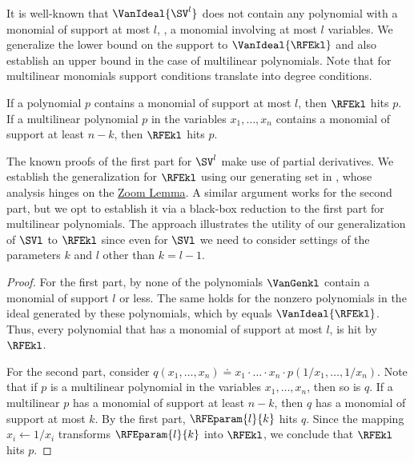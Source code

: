 \documentclass{toc}
\begin{document}
It is well-known that $\VanIdeal{\SV^l}$ does not contain any polynomial with a monomial of support at most $l$, \ie, a monomial involving at most $l$ variables. We generalize the lower bound on the support to $\VanIdeal{\RFEkl}$ and also establish an upper bound in the case of multilinear polynomials. Note that for multilinear monomials support conditions translate into degree conditions.
\begin{proposition}
    \label{prop.ideal.membership.degree-bound}
    If a polynomial $p$ contains a monomial of support at most $l$, then $\RFEkl$ hits $p$. 
    If a multilinear polynomial $p$ in the variables $x_1,\dots,x_n$ contains a monomial of support at least $n-k$, then $\RFEkl$ hits $p$.
\end{proposition}
The known proofs of the first part for $\SV^l$ make use of partial derivatives. We establish the generalization for $\RFEkl$ using our generating set in , whose analysis hinges on the \hyperref[lem.multi-zsub-deriv]{Zoom Lemma}. A similar argument works for the second part, but we opt to establish it via a black-box reduction to the first part for multilinear polynomials. The approach illustrates the utility of our generalization of $\SVl$ to $\RFEkl$ since even for $\SVl$ we need to consider settings of the parameters $k$ and $l$ other than $k=l-1$. 
\begin{proof}
    For the first part, by  none of the polynomials $\VanGenkl$ contain a monomial of support $l$ or less. The same holds for the nonzero polynomials in the ideal generated by these polynomials, which by  equals $\VanIdeal{\RFEkl}$. Thus, every polynomial that has a monomial of support at most $l$, is hit by $\RFEkl$. 

    For the second part, consider $q(x_1,\dots,x_n) \doteq x_1\cdot \dots \cdot x_n\cdot p(1/x_1,\dots,1/x_n)$. Note that if $p$ is a multilinear polynomial in the variables $x_1, \dots, x_n$, then so is $q$. If a multilinear $p$ has a monomial of support at least $n-k$, then $q$ has a monomial of support at most $k$. By the first part, $\RFEparam{l}{k}$ hits $q$. Since the mapping $x_i\gets 1/x_i$ transforms $\RFEparam{l}{k}$ into $\RFEkl$, we conclude that $\RFEkl$ hits $p$.
\end{proof}
\end{document}
